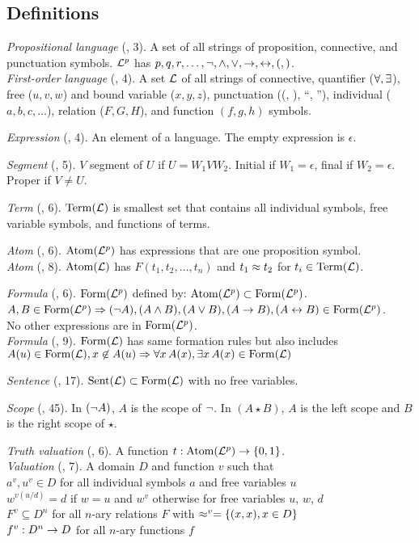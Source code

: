 \documentclass[class=cs245,nogeometry]{agony}
\newcommand{\dfn}[3]{\textit{#1} (\textsection #2, #3).}
\begin{document}
\begin{multicols}{2}
  \section*{Definitions}

  \dfn{Propositional language}{02}{3}
  A set of all strings of proposition, connective, and punctuation symbols.
  $\Lp$ has $p,q,r,\ldots,\n,\a,\o,\i,\e,(,)$. \\
  \dfn{First-order language}{11}{4}
  A set $\L$ of all strings of connective,
  quantifier ($\A,\X$), free ($u,v,w$) and bound variable ($x,y,z$),
  punctuation ((, ), ``, ''), individual ($a,b,c,\dotsc$),
  relation ($F,G,H$), and function $(f,g,h)$ symbols.

  \dfn{Expression}{02}{4} An element of a language.
  The empty expression is $\epsilon$.

  \dfn{Segment}{02}{5} $V$ segment of $U$ if $U = W_1VW_2$.
  Initial if $W_1 = \epsilon$, final if $W_2 = \epsilon$.
  Proper if $V \neq U$.

  \dfn{Term}{11}{6} $\Term(\L)$ is smallest set that contains
  all individual symbols, free variable symbols, and functions of terms.

  \dfn{Atom}{02}{6} $\Atom(\Lp)$ has expressions that are one proposition symbol. \\
  \dfn{Atom}{11}{8} $\Atom(\L)$ has $F(t_1,t_2,\dotsc,t_n)$ and $t_1 \eq t_2$ for $t_i \in \Term(\L)$.

  \dfn{Formula}{02}{6}
  $\Form(\Lp)$ defined by: $\Atom(\Lp) \subset \Form(\Lp)$. \\
  $A,B\in\Form(\Lp) \Rarr (\n A), (A \a B), (A \o B), (A \i B), (A \e B) \in \Form(\Lp)$. \\
  No other expressions are in $\Form(\Lp)$. \\
  \dfn{Formula}{11}{9} $\Form(\L)$ has same formation rules but also includes
  $A(u)\in\Form(\L), x\not\in A(u) \Rarr \A[x]A(x), \X[x]A(x) \in \Form(\L)$

  \dfn{Sentence}{11}{17} $\Sent(\L) \subset \Form(\L)$ with no free variables.

  \dfn{Scope}{02}{45}
  In $(\n A)$, $A$ is the scope of $\n$.
  In $(A \star B)$, $A$ is the left scope and $B$ is the right scope of $\star$.

  \dfn{Truth valuation}{03}{6} A function $t : \Atom(\Lp)\i\{0,1\}$. \\
  \dfn{Valuation}{12}{7} A domain $D$ and function $v$ such that \\
  $a^v, u^v \in D$ for all individual symbols $a$ and free variables $u$ \\
  $w^{v(u/d)} = d$ if $w = u$ and $w^v$ otherwise for free variables $u$, $w$, $d$ \\
  $F^v \subseteq D^n$ for all $n$-ary relations $F$ with $\eq^v = \{(x,x),x\in D\}$ \\
  $f^v : D^n \i D$ for all $n$-ary functions $f$


\end{multicols}
\end{document}
